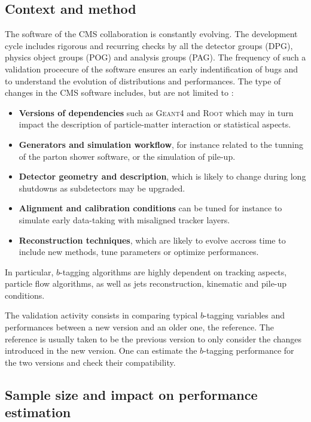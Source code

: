         \subsection{Context and method}

    The software of the CMS collaboration is constantly evolving. The development cycle
    includes rigorous and recurring checks by all the detector groups (DPG), physics
    object groups (POG) and analysis groups (PAG). The frequency of such a validation procecure
    of the software ensures an early indentification of bugs and to understand
    the evolution of distributions and performances. The type of changes in the CMS
    software includes, but are not limited to :
    \begin{itemize}
        \item \textbf{Versions of dependencies} such as \textsc{Geant4} and
              \textsc{Root} which may in turn impact the description of particle-matter
              interaction or statistical aspects.
        \item \textbf{Generators and simulation workflow}, for instance related to
              the tunning of the parton shower software, or the simulation of pile-up.
        \item \textbf{Detector geometry and description}, which is likely to change during
              long shutdowns as subdetectors may be upgraded.
        \item \textbf{Alignment and calibration conditions} can be tuned for instance to
              simulate early data-taking with misaligned tracker layers.
        \item \textbf{Reconstruction techniques}, which are likely to evolve accross time to include
              new methods, tune parameters or optimize performances.
    \end{itemize}

    In particular, $b$-tagging algorithms are highly dependent on tracking aspects,
    particle flow algorithms, as well as jets reconstruction, kinematic and pile-up conditions.

    The validation activity consists in comparing typical $b$-tagging variables and performances
    between a new version and an older one, the reference. The reference is usually taken to
    be the previous version to only consider the changes introduced in the new version.
    One can estimate the $b$-tagging performance for the two versions and check their
    compatibility.

    \subsection{Sample size and impact on performance estimation}

